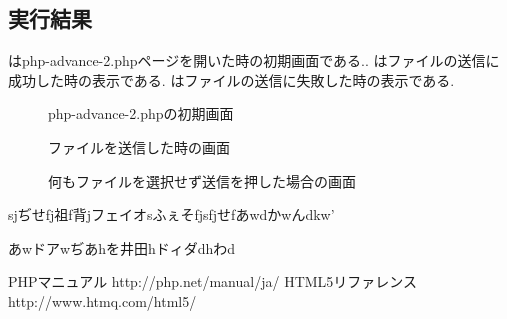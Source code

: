 \documentclass[a4j,10pt]{jsarticle}
\begin{document}


\subsection{実行結果}

はphp-advance-2.phpページを開いた時の初期画面である..
はファイルの送信に成功した時の表示である.
はファイルの送信に失敗した時の表示である.

\begin{figure}[H]
  \centering
  \caption{php-advance-2.phpの初期画面}
\label{fig:ad3}
\end{figure}

\begin{figure}[H]
  \centering
  \caption{ファイルを送信した時の画面}
\label{fig:ad4}
\end{figure}
\begin{figure}[H]
  \centering
  \caption{何もファイルを選択せず送信を押した場合の画面}
\label{fig:ad5}
\end{figure}
sjぢせfj祖f背jフェイオsふぇそfjsfjせfあwdかwんdkw’

あwドアwぢあhを井田hドィダdhわd


\begin{thebibliography}{4}
   PHPマニュアル http://php.net/manual/ja/
   HTML5リファレンス http://www.htmq.com/html5/
\end{thebibliography}
\end{document}
